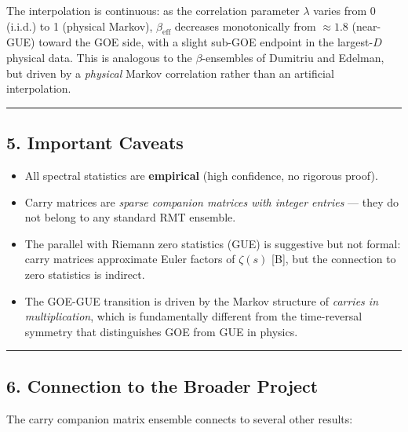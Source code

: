 \documentclass[
  11pt,
]{article}
\providecommand{\tightlist}{%
  \setlength{\itemsep}{0pt}\setlength{\parskip}{0pt}}
\begin{document}
The interpolation is continuous: as the correlation parameter \(\lambda\) varies
from 0 (i.i.d.) to 1 (physical Markov), \(\beta_{\text{eff}}\) decreases
monotonically from \(\approx 1.8\) (near-GUE) toward the GOE side, with a slight
sub-GOE endpoint in the largest-\(D\) physical data. This is analogous to the
\(\beta\)-ensembles of Dumitriu and Edelman, but driven by a \emph{physical}
Markov correlation rather than an artificial interpolation.

\begin{center}\rule{0.5\linewidth}{0.5pt}\end{center}

\newpage

\subsection{5. Important Caveats}\label{important-caveats}

\begin{itemize}
\tightlist
\item
  All spectral statistics are \textbf{empirical} (high confidence, no rigorous
  proof).
\item
  Carry matrices are \emph{sparse companion matrices with integer entries} ---
  they do not belong to any standard RMT ensemble.
\item
  The parallel with Riemann zero statistics (GUE) is suggestive but not formal:
  carry matrices approximate Euler factors of \(\zeta(s)\) {[}B{]}, but the
  connection to zero statistics is indirect.
\item
  The GOE-GUE transition is driven by the Markov structure of \emph{carries in
  multiplication}, which is fundamentally different from the time-reversal
  symmetry that distinguishes GOE from GUE in physics.
\end{itemize}

\begin{center}\rule{0.5\linewidth}{0.5pt}\end{center}

\newpage

\subsection{6. Connection to the Broader
Project}\label{connection-to-the-broader-project}

The carry companion matrix ensemble connects to several other results:
\end{document}

